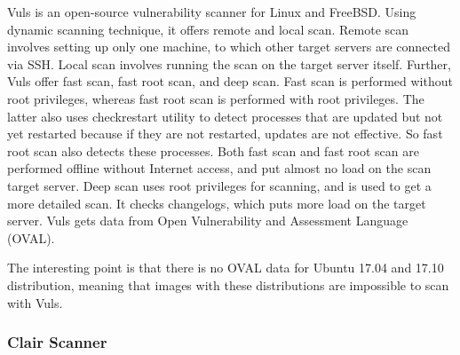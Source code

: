 \documentclass[a4paper,num-refs]{oup-contemporary}
\begin{document}
Vuls is an open-source vulnerability scanner for Linux and FreeBSD.
Using dynamic scanning technique, it offers
remote and local scan. Remote scan involves setting up only one machine, to
which other target servers are connected via SSH. Local scan involves running
the scan on the target server itself. Further, Vuls offer fast scan, fast root scan,
and deep scan.
Fast scan is performed without root privileges, whereas fast root scan is
performed with root privileges. The latter also uses checkrestart utility to 
detect processes that are updated but not yet restarted because if they are not
restarted, updates are not effective. So fast root scan also detects these
processes. Both fast scan and fast root scan are performed offline without Internet
access, and put almost no load on the scan target server. Deep scan uses
root privileges for scanning, and is used to get a more detailed scan. It checks
changelogs, which puts more load on the target server.
Vuls gets data from Open Vulnerability and Assessment Language (OVAL).

The interesting point is that there is no OVAL data for Ubuntu 17.04 and 17.10 distribution,
meaning that images with these distributions are impossible to scan with Vuls.



\subsubsection{Clair Scanner}
\end{document}
